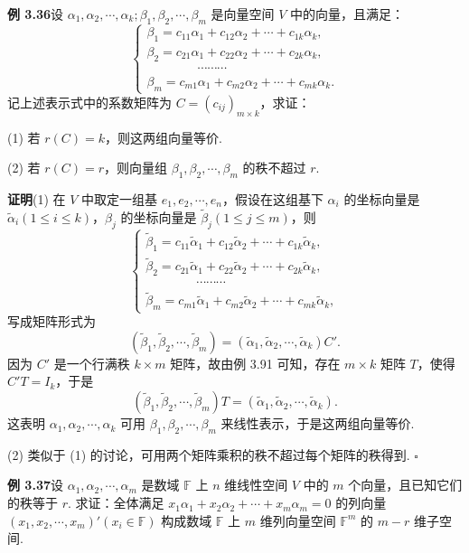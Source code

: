 \documentclass[UTF8, 12pt, fontset=fandol, oneside]{ctexart}
\begin{document}
\noindent\textbf{例 3.36}\quad 设 $\alpha_1,\alpha_2,\cdots,\alpha_k;\beta_1,\beta_2,\cdots,\beta_m$ 是向量空间 $V$ 中的向量，且满足：
\[
\left\{
\begin{array}{l}
\beta_1=c_{11}\alpha_1+c_{12}\alpha_2+\cdots+c_{1k}\alpha_k,\\
\beta_2=c_{21}\alpha_1+c_{22}\alpha_2+\cdots+c_{2k}\alpha_k,\\
\hspace{4em}\cdots\cdots\cdots\\
\beta_m=c_{m1}\alpha_1+c_{m2}\alpha_2+\cdots+c_{mk}\alpha_k.
\end{array}
\right.
\]
记上述表示式中的系数矩阵为 $C=(c_{ij})_{m\times k}$，求证：

(1) 若 $r(C)=k$，则这两组向量等价.

(2) 若 $r(C)=r$，则向量组 $\beta_1,\beta_2,\cdots,\beta_m$ 的秩不超过 $r$.

\noindent\textbf{证明}\quad (1) 在 $V$ 中取定一组基 $e_1,e_2,\cdots,e_n$，假设在这组基下 $\alpha_i$ 的坐标向量是 $\widetilde\alpha_i(1\le i\le k)$，$\beta_j$ 的坐标向量是 $\widetilde\beta_j(1\le j\le m)$，则
\[
\left\{
\begin{array}{l}
\widetilde\beta_1=c_{11}\widetilde\alpha_1+c_{12}\widetilde\alpha_2+\cdots+c_{1k}\widetilde\alpha_k,\\
\widetilde\beta_2=c_{21}\widetilde\alpha_1+c_{22}\widetilde\alpha_2+\cdots+c_{2k}\widetilde\alpha_k,\\
\hspace{4em}\cdots\cdots\cdots\\
\widetilde\beta_m=c_{m1}\widetilde\alpha_1+c_{m2}\widetilde\alpha_2+\cdots+c_{mk}\widetilde\alpha_k,
\end{array}
\right.
\]
写成矩阵形式为
\[
(\widetilde\beta_1,\widetilde\beta_2,\cdots,\widetilde\beta_m)=(\widetilde\alpha_1,\widetilde\alpha_2,\cdots,\widetilde\alpha_k)C'.
\]
因为 $C'$ 是一个行满秩 $k\times m$ 矩阵，故由例 3.91 可知，存在 $m\times k$ 矩阵 $T$，使得 $C'T=I_k$，于是
\[
(\widetilde\beta_1,\widetilde\beta_2,\cdots,\widetilde\beta_m)T=(\widetilde\alpha_1,\widetilde\alpha_2,\cdots,\widetilde\alpha_k).
\]
这表明 $\alpha_1,\alpha_2,\cdots,\alpha_k$ 可用 $\beta_1,\beta_2,\cdots,\beta_m$ 来线性表示，于是这两组向量等价.

(2) 类似于 (1) 的讨论，可用两个矩阵乘积的秩不超过每个矩阵的秩得到. $\square$

\noindent\textbf{例 3.37}\quad 设 $\alpha_1,\alpha_2,\cdots,\alpha_m$ 是数域 $\mathbb{F}$ 上 $n$ 维线性空间 $V$ 中的 $m$ 个向量，且已知它们的秩等于 $r$. 求证：全体满足 $x_1\alpha_1+x_2\alpha_2+\cdots+x_m\alpha_m=0$ 的列向量 $(x_1,x_2,\cdots,x_m)'(x_i\in\mathbb{F})$ 构成数域 $\mathbb{F}$ 上 $m$ 维列向量空间 $\mathbb{F}^m$ 的 $m-r$ 维子空间.
\end{document}
